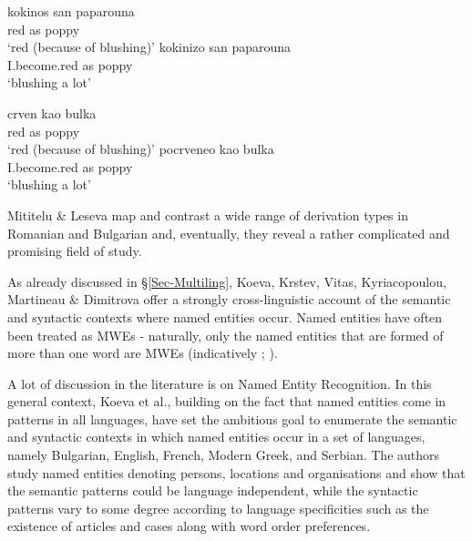 \documentclass[output=paper]{langsci/langscibook}
\begin{document}
\begin{exe}
\settowidth {}
\ex \label{ex:6:paparouna}
\begin{xlist}
\ex
\gll 
kokinos san paparouna\\
     red as  poppy \\ 
\glt `red (because of blushing)’
\ex
\gll kokinizo san paparouna\\
      I.become.red as  poppy\\
\glt    `blushing a lot’
\end{xlist}
\end{exe}

\begin{exe}
\settowidth {}
\ex \label{ex:7:bulka}
\begin{xlist}
\ex
\gll 
crven kao bulka\\ 
       red as  poppy \\   
     \glt `red (because of blushing)’
\ex
\gll       pocrveneo kao bulka \\
 I.become.red as poppy\\
 \glt     `blushing a lot’
 \end{xlist}
 \end{exe}
 
 Mititelu \& Leseva map and contrast a wide range of derivation types in Romanian and Bulgarian and, eventually, they reveal a rather complicated and promising field of study. 


As already discussed in §\ref{Sec-Multiling},  Koeva, Krstev,  Vitas,  Kyriacopoulou,  Martineau \& Dimitrova offer a strongly cross-linguistic account of the semantic and syntactic contexts where named entities occur. 
Named entities have often been treated as MWEs - naturally, only the named entities that are formed of more than one word are MWEs (indicatively \citealt{Downey:al:07}; \citealt{vincze2011}). 

A lot of discussion in the literature is on Named Entity Recognition. In this general context, Koeva et al., building on the fact that named entities come in patterns in all languages, have set the ambitious goal to enumerate the semantic and syntactic contexts in which named entities occur in a set of languages, namely Bulgarian, English, French, Modern Greek, and Serbian. The authors study named entities denoting persons, locations and organisations and show that the semantic patterns could be language independent, while the syntactic patterns vary to some degree according to language specificities such as the existence of articles and cases along with word order preferences.
\end{document}

